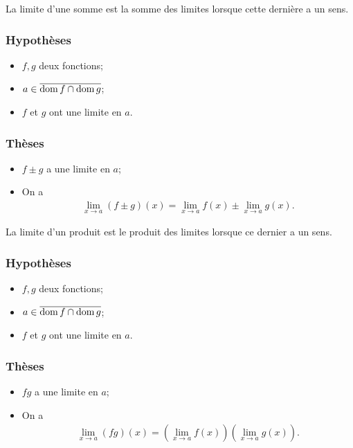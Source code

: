 \documentclass[main.tex]{subfiles}
\begin{document}
La limite d'une somme est la somme des limites
lorsque cette dernière a un sens.

\begin{proposition}

    \subsubsection*{Hypothèses}
    \begin{itemize}
        \item $f, g$ deux fonctions;
        \item $a \in \overline{\operatorname{dom} f \cap \operatorname{dom} g}$;
        \item $f$ et $g$ ont une limite en $a$.
    \end{itemize}

    \subsubsection*{Thèses}
    \begin{itemize}
        \item $f \pm g$ a une limite en $a$;
        \item On a
            \begin{align}
                \lim_{x \to a} (f \pm g)(x) = \lim_{x \to a} f(x) \pm \lim_{x \to a} g(x).
            \end{align}
    \end{itemize}
\end{proposition}

La limite d'un produit est le produit des limites
lorsque ce dernier a un sens.

\begin{proposition}

    \subsubsection*{Hypothèses}
    \begin{itemize}
        \item $f, g$ deux fonctions;
        \item $a \in \overline{\operatorname{dom} f \cap \operatorname{dom} g}$;
        \item $f$ et $g$ ont une limite en $a$.
    \end{itemize}

    \subsubsection*{Thèses}
    \begin{itemize}
        \item $f g$ a une limite en $a$;
        \item On a
        \begin{align}
            \lim_{x \to a} (fg)(x) = \left(\lim_{x \to a} f(x)\right) \left(\lim_{x \to a} g(x)\right).
        \end{align}
    \end{itemize}
\end{proposition}
\end{document}
